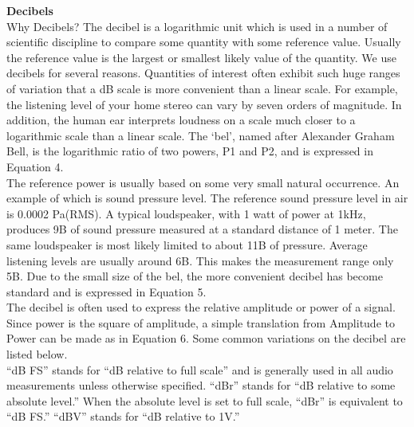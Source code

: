 \textbf{Decibels}\\
Why Decibels? The decibel is a logarithmic unit which is used in a number of scientific discipline to compare some quantity with some reference value. Usually the reference value is the largest or smallest likely value of the quantity. We use decibels for several reasons. Quantities of interest often exhibit such huge ranges of variation that a dB scale is more convenient than a linear scale. For example, the listening level of your home stereo can vary by seven orders of magnitude. In addition, the human ear interprets loudness on a scale much closer to a logarithmic scale than a linear scale. The ‘bel’, named after Alexander Graham Bell, is the logarithmic ratio of two powers, P1 and P2, and is expressed in Equation 4.\\
The reference power is usually based on some very small natural occurrence. An example of which is sound pressure level. The reference sound pressure level in air is 0.0002 Pa(RMS). A typical loudspeaker, with 1 watt of power at 1kHz, produces 9B of sound pressure measured at a standard distance of 1 meter. The same loudspeaker is most likely limited to about 11B of pressure. Average listening levels are usually around 6B. This makes the measurement range only 5B. Due to the small size of the bel, the more convenient decibel has become standard and is expressed in Equation 5. \\
The decibel is often used to express the relative amplitude or power of a signal. Since power is the square of amplitude, a simple translation from Amplitude to Power can be made as in Equation 6. Some common variations on the decibel are listed below.\\
“dB FS” stands for “dB relative to full scale” and is generally used in all audio measurements unless otherwise specified. “dBr” stands for “dB relative to some absolute level.” When the absolute level is set to full scale, “dBr” is equivalent to “dB FS.” “dBV” stands for “dB relative to 1V.”\\

